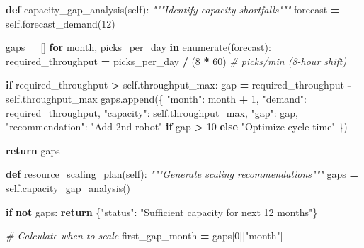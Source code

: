 \documentclass[
]{article}
\newenvironment{Shaded}{\begin{snugshade}}{\end{snugshade}}
\newcommand{\BuiltInTok}[1]{#1}
\newcommand{\CommentTok}[1]{\textcolor[rgb]{0.56,0.35,0.01}{\textit{#1}}}
\newcommand{\ControlFlowTok}[1]{\textcolor[rgb]{0.13,0.29,0.53}{\textbf{#1}}}
\newcommand{\DecValTok}[1]{\textcolor[rgb]{0.00,0.00,0.81}{#1}}
\newcommand{\KeywordTok}[1]{\textcolor[rgb]{0.13,0.29,0.53}{\textbf{#1}}}
\newcommand{\NormalTok}[1]{#1}
\newcommand{\OperatorTok}[1]{\textcolor[rgb]{0.81,0.36,0.00}{\textbf{#1}}}
\newcommand{\StringTok}[1]{\textcolor[rgb]{0.31,0.60,0.02}{#1}}
\newcommand{\VariableTok}[1]{\textcolor[rgb]{0.00,0.00,0.00}{#1}}
\begin{document}
\begin{Shaded}
\begin{Highlighting}[]
    \KeywordTok{def}\NormalTok{ capacity\_gap\_analysis(}\VariableTok{self}\NormalTok{):}
        \CommentTok{"""Identify capacity shortfalls"""}
\NormalTok{        forecast }\OperatorTok{=} \VariableTok{self}\NormalTok{.forecast\_demand(}\DecValTok{12}\NormalTok{)}

\NormalTok{        gaps }\OperatorTok{=}\NormalTok{ []}
        \ControlFlowTok{for}\NormalTok{ month, picks\_per\_day }\KeywordTok{in} \BuiltInTok{enumerate}\NormalTok{(forecast):}
\NormalTok{            required\_throughput }\OperatorTok{=}\NormalTok{ picks\_per\_day }\OperatorTok{/}\NormalTok{ (}\DecValTok{8} \OperatorTok{*} \DecValTok{60}\NormalTok{)  }\CommentTok{\# picks/min (8{-}hour shift)}

            \ControlFlowTok{if}\NormalTok{ required\_throughput }\OperatorTok{\textgreater{}} \VariableTok{self}\NormalTok{.throughput\_max:}
\NormalTok{                gap }\OperatorTok{=}\NormalTok{ required\_throughput }\OperatorTok{{-}} \VariableTok{self}\NormalTok{.throughput\_max}
\NormalTok{                gaps.append(\{}
                    \StringTok{"month"}\NormalTok{: month }\OperatorTok{+} \DecValTok{1}\NormalTok{,}
                    \StringTok{"demand"}\NormalTok{: required\_throughput,}
                    \StringTok{"capacity"}\NormalTok{: }\VariableTok{self}\NormalTok{.throughput\_max,}
                    \StringTok{"gap"}\NormalTok{: gap,}
                    \StringTok{"recommendation"}\NormalTok{: }\StringTok{"Add 2nd robot"} \ControlFlowTok{if}\NormalTok{ gap }\OperatorTok{\textgreater{}} \DecValTok{10} \ControlFlowTok{else} \StringTok{"Optimize cycle time"}
\NormalTok{                \})}

        \ControlFlowTok{return}\NormalTok{ gaps}

    \KeywordTok{def}\NormalTok{ resource\_scaling\_plan(}\VariableTok{self}\NormalTok{):}
        \CommentTok{"""Generate scaling recommendations"""}
\NormalTok{        gaps }\OperatorTok{=} \VariableTok{self}\NormalTok{.capacity\_gap\_analysis()}

        \ControlFlowTok{if} \KeywordTok{not}\NormalTok{ gaps:}
            \ControlFlowTok{return}\NormalTok{ \{}\StringTok{"status"}\NormalTok{: }\StringTok{"Sufficient capacity for next 12 months"}\NormalTok{\}}

        \CommentTok{\# Calculate when to scale}
\NormalTok{        first\_gap\_month }\OperatorTok{=}\NormalTok{ gaps[}\DecValTok{0}\NormalTok{][}\StringTok{"month"}\NormalTok{]}


\end{Highlighting}
\end{Shaded}
\end{document}
